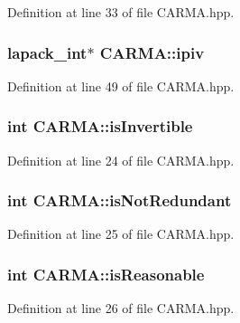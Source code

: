 Definition at line 33 of file C\-A\-R\-M\-A.\-hpp.

\hypertarget{class_c_a_r_m_a_ad000fbedcf5b10d37212f43c23e65431}{
\subsubsection[{ipiv}]{\setlength{\rightskip}{0pt plus 5cm}lapack\-\_\-int$\ast$ C\-A\-R\-M\-A\-::ipiv}}\label{class_c_a_r_m_a_ad000fbedcf5b10d37212f43c23e65431}


Definition at line 49 of file C\-A\-R\-M\-A.\-hpp.

\hypertarget{class_c_a_r_m_a_ab8907880b6740bbc95f011957495d41b}{
\subsubsection[{is\-Invertible}]{\setlength{\rightskip}{0pt plus 5cm}int C\-A\-R\-M\-A\-::is\-Invertible}}\label{class_c_a_r_m_a_ab8907880b6740bbc95f011957495d41b}


Definition at line 24 of file C\-A\-R\-M\-A.\-hpp.

\hypertarget{class_c_a_r_m_a_a1da5f1d423116967c885b09cd4729ca3}{
\subsubsection[{is\-Not\-Redundant}]{\setlength{\rightskip}{0pt plus 5cm}int C\-A\-R\-M\-A\-::is\-Not\-Redundant}}\label{class_c_a_r_m_a_a1da5f1d423116967c885b09cd4729ca3}


Definition at line 25 of file C\-A\-R\-M\-A.\-hpp.

\hypertarget{class_c_a_r_m_a_a845e25047e97b9b629b32a3c592f3d29}{
\subsubsection[{is\-Reasonable}]{\setlength{\rightskip}{0pt plus 5cm}int C\-A\-R\-M\-A\-::is\-Reasonable}}\label{class_c_a_r_m_a_a845e25047e97b9b629b32a3c592f3d29}


Definition at line 26 of file C\-A\-R\-M\-A.\-hpp.

